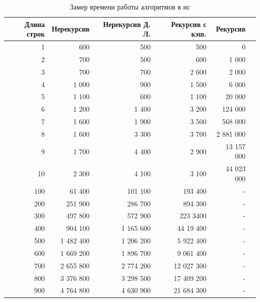 \begin{table}[!ht]
    \small
    \centering
    \caption{Замер времени работы алгоритмов в нс} 
    \label{tab:perform}
    \begin{tabular}{|r|r|r|r|r|r|}
    \hline
	Длина строк & Нерекурсив & Нерекурсив Д. Л. & Рекурсив с кэш. & Рекурсив \\ \hline
        1 & 600 & 500 & 500 & 0   \\ \hline
        2 & 700 & 500 & 600 & 1 000   \\ \hline
        3 & 700 & 700 & 2 600 & 2 000  \\ \hline
        4 & 1 000 & 900 & 1 500 & 6 000  \\ \hline
        5 & 1 100 & 600 & 1 100 & 20 000  \\ \hline
        6 & 1 200 & 1 400 & 3 200 & 124 000  \\ \hline
        7 & 1 600 & 1 900 & 3 500 & 568 000  \\ \hline
        8 & 1 600 & 3 300 & 3 700 & 2 881 000  \\ \hline
        9 & 1 700 & 4 400 & 2 900 & 13 157 000 \\ \hline
        10 & 2 300 & 4 100 & 3 100 & 44 023 000  \\ \hline
        100 & 61 400 & 101 100 & 193 400 & -  \\ \hline
        200 & 251 900 & 286 700 & 894 300 & -  \\ \hline
        300 & 497 800 & 572 900 & 223 3400 & -  \\ \hline
        400 & 904 100 & 1 165 600 & 44 19 400 & -   \\ \hline
        500 & 1 482 400 & 1 206 200 & 5 922 400 & -  \\ \hline
        600 & 1 669 200 & 1 896 700 & 9 061 400 & -  \\ \hline
        700 & 2 655 800 & 2 774 200 & 12 027 300 & -  \\ \hline
        800 & 3 376 800 & 3 298 500 & 17 409 200 & -  \\ \hline
        900 & 4 764 800 & 4 630 900 & 21 684 300 & -  \\ \hline
    \end{tabular}
\end{table}



